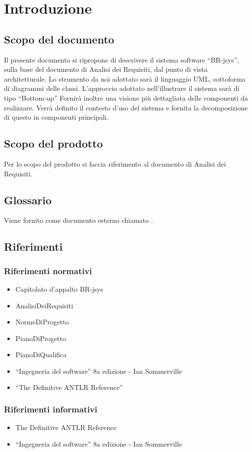 \documentclass[11pt,titlepage,a4paper]{report}
\begin{document}
\newpage
\tableofcontents
\chapter{Introduzione}
\section{Scopo del documento}
Il presente documento si ripropone di descrivere il sistema software ``BR-jsys'', sulla base del documento di Analisi dei Requisiti, dal punto di vista architetturale. Lo strumento da noi adottato sar\`a il linguaggio UML, sottoforma di diagrammi delle classi. L'approccio adottato nell'illustrare il sistema sar\`a di tipo ``Bottom-up'' Fornir\`a inoltre una visione pi\`u dettagliata delle componenti da realizzare.
Verr\`a definito il contesto d'uso del sistema e fornita la decomposizione di questo in componenti principali.
\section{Scopo del prodotto}
Per lo scopo del prodotto si faccia riferimento al documento di Analisi dei Requisiti.
\section{Glossario}
Viene fornito come documento esterno chiamato \Glossario .
\section{Riferimenti}
\subsection{Riferimenti normativi}
\begin{itemize}
\item Capitolato d'appalto BR-jsys
\item AnalisiDeiRequisiti
\item NormeDiProgetto
\item PianoDiProgetto
\item PianoDiQualifica
\item ``Ingegneria del software'' 8a edizione - Ian Sommerville 
\item ``The Definitive ANTLR Reference''
\end{itemize}
\subsection{Riferimenti informativi}
\begin{itemize}
\item The Definitive ANTLR Reference
\item ``Ingegneria del software'' 8a edizione - Ian Sommerville
\end{itemize}
\end{document}
